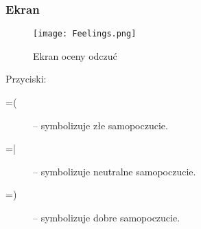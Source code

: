 \subsubsection{Ekran}
\begin{figure}[b!]
  \texttt{[image: Feelings.png]}
  \caption{Ekran oceny odczuć}
  \label{HF}
\end{figure}
Przyciski:\\
\begin{description}
  \item[=(] -- symbolizuje złe samopoczucie.
  \item[=|] -- symbolizuje neutralne samopoczucie.
  \item[=)] -- symbolizuje dobre samopoczucie.
\end{description}

